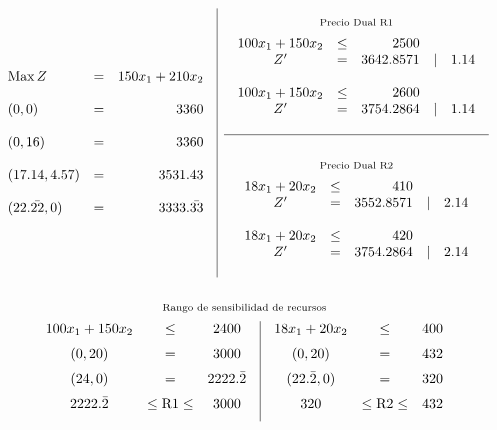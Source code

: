 \documentclass[12pt]{article}
\begin{document}
\[
\begin{array}{c|c}
  \begin{array}{l c r}
    \text{Max} \, Z & = & 150x_1 + 210x_2 \\\\
    (0,0) & = & 3360 \\\\
    (0,16) & = & 3360 \\\\
    (17.14,4.57) & = & 3531.43 \\\\
    (22.\bar{22},0) & = & 3333.\bar{33}
  \end{array}
  &
  \begin{array}{c}
    \overset{\text{Precio Dual R1}\vphantom{\Big|}}{
    \begin{array}{c c r c r}
      100x_1 + 150x_2 & \leq & 2500 &&\\
      Z' & = & 3642.8571 & \mid & 1.14  \\\\
      100x_1 + 150x_2 & \leq & 2600 &&\\
      Z' & = & 3754.2864 & \mid & 1.14  \\\\
    \end{array}} \\
    \hline \\
    \overset{\text{Precio Dual R2}\vphantom{\Big|}}{
    \begin{array}{c c r c r}
      18x_1 + 20x_2 & \leq & 410 &&\\
      Z' & = & 3552.8571 & \mid & 2.14  \\\\
      18x_1 + 20x_2 & \leq & 420 &&\\
      Z' & = & 3754.2864 & \mid & 2.14  \\\\
    \end{array}}
  \end{array}
\end{array}
\]

\[\overset{\text{Rango de sensibilidad de recursos}\vphantom{\Big|}}{
  \begin{array}{c|c}
    \begin{array}{c c c}
      100x_1 + 150x_2 & \leq & 2400 \\[6pt]
      (0,20) & = & 3000 \\[6pt]
      (24,0) & = & 2222.\bar{2} \\[6pt]
      2222.\bar{2} & \leq \text{R1} \leq & 3000 \\[6pt]
    \end{array}
    &
    \begin{array}{c c c}
      18x_1 + 20x_2 & \leq & 400 \\[6pt]
      (0,20) & = & 432 \\[6pt]
      (22.\bar{2},0) & = & 320 \\[6pt]
      320 & \leq \text{R2} \leq & 432 \\[6pt]
    \end{array}
  \end{array}
}\]
\end{document}

